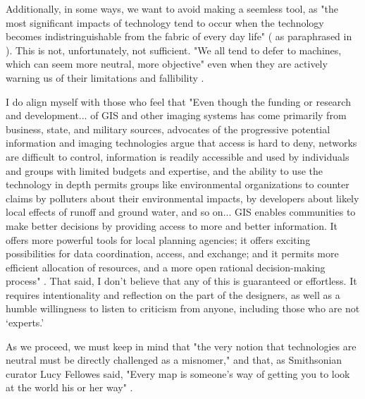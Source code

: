 Additionally, in some ways, we want to avoid making a seemless tool, as "the most significant impacts of technology tend to occur when the technology becomes indistringuishable from the fabric of every day life" (\cite{weinerComputer21stCentury1991} as paraphrased in \cite{vereginComputerInnovationAdoption1994}). This is not, unfortunately, not sufficient. "We all tend to defer to machines, which can seem more neutral, more objective" even when they are actively warning us of their limitations and fallibility \cite{eubanksAutomatingInequalityHow2018}.

I do align myself with those who feel that "Even though the funding or research and development... of GIS and other imaging systems has come primarily from business, state, and military sources, advocates of the progressive potential information and imaging technologies argue that access is hard to deny, networks are difficult to control, information is readily accessible and used by individuals and groups with limited budgets and expertise, and the ability to use the technology in depth permits groups like environmental organizations to counter claims by polluters about their environmental impacts, by developers about likely local effects of runoff and ground water, and so on... GIS enables communities to make better decisions by providing access to more and better information. It offers more powerful tools for local planning agencies; it offers exciting possibilities for data coordination, access, and exchange; and it permits more efficient allocation of resources, and a more open rational decision-making process" \cite{picklesRepresentationsElectronicAge1994}. That said, I don't believe that any of this is guaranteed or effortless. It requires intentionality and reflection on the part of the designers, as well as a humble willingness to listen to criticism from anyone, including those who are not `experts.'

As we proceed, we must keep in mind that "the very notion that technologies are neutral must be directly challenged as a misnomer," \cite{nobleAlgorithmsOppressionHow2018} and that, as Smithsonian curator Lucy Fellowes said, "Every map is someone's way of getting you to look at the world his or her way" \cite{henriksonPowerPoliticsMaps1994}. 



